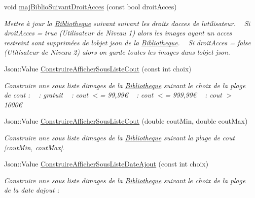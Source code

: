 \begin{DoxyCompactItemize}
void \hyperlink{classBibliotheque_a61778c23eb938c95b4de4306c14fe754}{maj\+Biblio\+Suivant\+Droit\+Acces} (const bool droit\+Acces)
\begin{DoxyCompactList}\small\item\em Mettre à jour la \hyperlink{classBibliotheque}{Bibliotheque} suivant suivant les droits d\textquotesingle{}acces de l\textquotesingle{}utilisateur. ~\newline
 Si droit\+Acces = true (Utilisateur de Niveau 1) alors les images ayant un acces restreint sont supprimées de l\textquotesingle{}objet json de la \hyperlink{classBibliotheque}{Bibliotheque}. ~\newline
 Si droit\+Acces = false (Utilisateur de Niveau 2) alors on garde toutes les images dans l\textquotesingle{}objet json. \end{DoxyCompactList}\item 
Json\+::\+Value \hyperlink{classBibliotheque_a69655581e76d36176a4336a1504a2781}{Construire\+Afficher\+Sous\+Liste\+Cout} (const int choix)
\begin{DoxyCompactList}\small\item\em Construire une sous liste d\textquotesingle{}images de la \hyperlink{classBibliotheque}{Bibliotheque} suivant le choix de la plage de cout \+: ~ \+: gratuit ~ \+: cout $<$= 99,99€ ~ \+: cout $<$= 999,99€ ~ \+: cout $>$ 1000€ \end{DoxyCompactList}\item 
Json\+::\+Value \hyperlink{classBibliotheque_a3b03f7002bdb3bf8292ab5a676f74bf0}{Construire\+Afficher\+Sous\+Liste\+Cout} (double cout\+Min, double cout\+Max)
\begin{DoxyCompactList}\small\item\em Construire une sous liste d\textquotesingle{}images de la \hyperlink{classBibliotheque}{Bibliotheque} suivant la plage de cout \mbox{[}cout\+Min, cout\+Max\mbox{]}. \end{DoxyCompactList}\item 
Json\+::\+Value \hyperlink{classBibliotheque_a6b50b88a3f8f402052649e1bdc495b9a}{Construire\+Afficher\+Sous\+Liste\+Date\+Ajout} (const int choix)
\begin{DoxyCompactList}\small\item\em Construire une sous liste d\textquotesingle{}images de la \hyperlink{classBibliotheque}{Bibliotheque} suivant le choix de la plage de la date d\textquotesingle{}ajout \+: ~\newline

\end{DoxyCompactList}
\end{DoxyCompactItemize}
